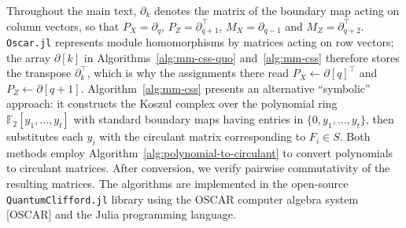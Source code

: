 \documentclass[%
 reprint,
 superscriptaddress, 
 amsmath,amssymb,
 aps,
 pra,
 floatfix,
]{revtex4-2}
\theoremstyle{definition}
\theoremstyle{definition}
\begin{document}
{Throughout the main text, $\partial_k$ denotes the matrix of the boundary map acting on column vectors, so that $P_X = \partial_q$, $P_Z = \partial_{q+1}^{\top}$, $M_X = \partial_{q-1}$ and $M_Z = \partial_{q+2}^{\top}$. \texttt{Oscar.jl} represents module homomorphisms by matrices acting on row vectors; the array $\partial[k]$ in Algorithms~\ref{alg:mm-css-quo} and~\ref{alg:mm-css} therefore stores the transpose $\partial_k^{\top}$, which is why the assignments there read $P_X \gets \partial[q]^{\top}$ and $P_Z \gets \partial[q+1]$. }Algorithm~\ref{alg:mm-css} presents an alternative ``symbolic'' approach: it constructs the Koszul complex over the polynomial ring $\mathbb{F}_2[y_1, \ldots, y_t]$ with standard boundary maps having entries in $\{0, y_1, \ldots, y_t\}$, then substitutes each $y_i$ with the circulant matrix corresponding to $F_i \in S$. Both methods employ Algorithm~\ref{alg:polynomial-to-circulant} to convert polynomials to circulant matrices. After conversion, we verify pairwise commutativity of the resulting matrices. The algorithms are implemented in the open-source \texttt{QuantumClifford.jl} library using the OSCAR computer algebra system [OSCAR] and the Julia programming language.
\end{document}
